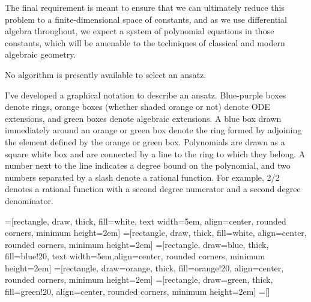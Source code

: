 \documentclass{article}
\newcommand{\tikzmark}[1]{\tikz[overlay,remember picture] \node (#1) {};}
\begin{document}
The final requirement is meant to ensure that we can ultimately reduce this
problem to a finite-dimensional space of constants, and as we use differential
algebra throughout, we expect a system of polynomial equations in those
constants, which will be
amenable to the techniques of classical and modern algebraic geometry.

No algorithm is presently available to select an ansatz.

I've developed a graphical notation to describe an ansatz.  Blue-purple boxes
denote rings, orange boxes (whether shaded orange or not) denote ODE extensions, and green boxes denote
algebraic extensions.  A blue box drawn immediately around an orange or green box
denote the ring formed by adjoining the element defined by the orange or green box.
Polynomials are drawn as a square white box and are
connected by a line to the ring to which they belong.  A number next to
the line indicates a degree bound on the polynomial, and two numbers
separated by a slash denote a rational function.  For example, 2/2 denotes
a rational function with a second degree numerator and a second degree
denominator.

=[rectangle, draw, thick, fill=white, text width=5em, align=center, rounded corners, minimum height=2em]
=[rectangle, draw, thick, fill=white, align=center, rounded corners, minimum height=2em]
=[rectangle, draw=blue, thick, fill=blue!20, text width=5em,align=center, rounded corners, minimum height=2em]
=[rectangle, draw=orange, thick, fill=orange!20, align=center, rounded corners, minimum height=2em]
=[rectangle, draw=green, thick, fill=green!20, align=center, rounded corners, minimum height=2em]
=[]

\end{document}
